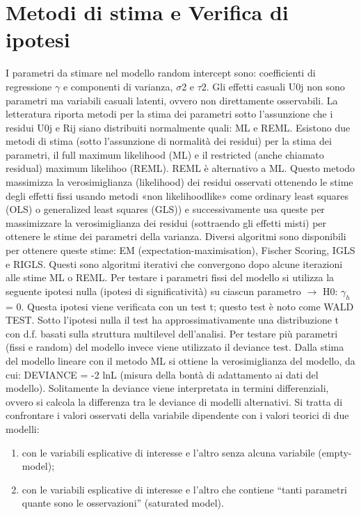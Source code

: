 \documentclass[a4page, 11pt]{article}
\begin{document}
\section{Metodi di stima e Verifica di ipotesi}

I parametri da stimare nel modello random intercept sono: coefficienti di regressione $\gamma$ e componenti di varianza, $\sigma$2 e $\tau$2. Gli effetti casuali U0j non sono parametri ma variabili casuali latenti, ovvero non direttamente osservabili. La letteratura riporta metodi per la stima dei parametri sotto l’assunzione che i residui U0j e Rij siano distribuiti normalmente quali: ML e REML. Esistono due metodi di stima (sotto l’assunzione di normalità dei residui) per la stima dei parametri, il full maximum likelihood (ML) e il restricted (anche chiamato residual) maximum likelihoo (REML).
\newline
REML è alternativo a ML. Questo metodo massimizza la verosimiglianza (likelihood) dei residui osservati ottenendo le stime degli effetti fissi usando metodi «non likelihoodlike» come ordinary least squares (OLS) o generalized least squares (GLS)) e successivamente usa queste per massimizzare la verosimiglianza dei residui (sottraendo gli effetti misti) per ottenere le stime dei parametri della varianza. Diversi algoritmi sono disponibili per ottenere queste stime: EM (expectation-maximisation), Fischer Scoring, IGLS e RIGLS. Questi sono algoritmi iterativi che convergono dopo alcune iterazioni alle stime ML o REML.
Per testare i parametri fissi del modello si utilizza la seguente ipotesi nulla (ipotesi di significatività) su ciascun parametro $\rightarrow$ H0: $\gamma_h$ = 0.
\newline
Questa ipotesi viene verificata con un test t; questo test è noto come WALD TEST. Sotto l’ipotesi nulla il test ha approssimativamente una distribuzione t con d.f. basati sulla struttura multilevel dell’analisi. Per testare più parametri (fissi e random) del modello invece viene utilizzato il deviance test. Dalla stima del modello lineare con il metodo ML si ottiene la verosimiglianza del modello, da cui: DEVIANCE = -2 lnL (misura della bontà di adattamento ai dati del modello).
\newline
Solitamente la deviance viene interpretata in termini differenziali, ovvero si calcola la differenza tra le deviance di modelli alternativi. Si tratta di confrontare i valori osservati della variabile dipendente con i valori teorici di due modelli: 
\begin{enumerate}[noitemsep]
\item con le variabili esplicative di interesse e l’altro senza alcuna variabile (empty-model); 
\item con le variabili esplicative di interesse e l’altro che contiene “tanti parametri quante sono le osservazioni” (saturated model).
\end{enumerate}
\end{document}
